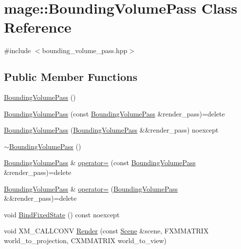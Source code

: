 \hypertarget{classmage_1_1_bounding_volume_pass}{}\section{mage\+:\+:Bounding\+Volume\+Pass Class Reference}
\label{classmage_1_1_bounding_volume_pass}


{\ttfamily \#include $<$bounding\+\_\+volume\+\_\+pass.\+hpp$>$}

\subsection*{Public Member Functions}
\begin{DoxyCompactItemize}
\item 
\hyperlink{classmage_1_1_bounding_volume_pass_ab32eb9086e463f5260f8999b78b55b26}{Bounding\+Volume\+Pass} ()
\item 
\hyperlink{classmage_1_1_bounding_volume_pass_a21408cc53051c9c6d94efe41b3bea404}{Bounding\+Volume\+Pass} (const \hyperlink{classmage_1_1_bounding_volume_pass}{Bounding\+Volume\+Pass} \&render\+\_\+pass)=delete
\item 
\hyperlink{classmage_1_1_bounding_volume_pass_a569c5b210bb1135771970ef7ac70c210}{Bounding\+Volume\+Pass} (\hyperlink{classmage_1_1_bounding_volume_pass}{Bounding\+Volume\+Pass} \&\&render\+\_\+pass) noexcept
\item 
\hyperlink{classmage_1_1_bounding_volume_pass_a41dc433aed26f05e8b60462a6e337509}{$\sim$\+Bounding\+Volume\+Pass} ()
\item 
\hyperlink{classmage_1_1_bounding_volume_pass}{Bounding\+Volume\+Pass} \& \hyperlink{classmage_1_1_bounding_volume_pass_a2115e9af06e0bc7e42fc95e10f0dacad}{operator=} (const \hyperlink{classmage_1_1_bounding_volume_pass}{Bounding\+Volume\+Pass} \&render\+\_\+pass)=delete
\item 
\hyperlink{classmage_1_1_bounding_volume_pass}{Bounding\+Volume\+Pass} \& \hyperlink{classmage_1_1_bounding_volume_pass_a3887d5ffbb5e175187004f0b057ddcaa}{operator=} (\hyperlink{classmage_1_1_bounding_volume_pass}{Bounding\+Volume\+Pass} \&\&render\+\_\+pass)=delete
\item 
void \hyperlink{classmage_1_1_bounding_volume_pass_ab38a107beb5481e923526d51e9fdfbe2}{Bind\+Fixed\+State} () const noexcept
\item 
void X\+M\+\_\+\+C\+A\+L\+L\+C\+O\+NV \hyperlink{classmage_1_1_bounding_volume_pass_ad17f8f6c68d19ffa39e5a3dbe5737c86}{Render} (const \hyperlink{classmage_1_1_scene}{Scene} \&scene, F\+X\+M\+M\+A\+T\+R\+IX world\+\_\+to\+\_\+projection, C\+X\+M\+M\+A\+T\+R\+IX world\+\_\+to\+\_\+view)
\end{DoxyCompactItemize}
